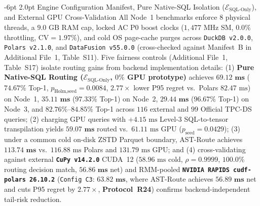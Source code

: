 \documentclass[10pt,a4paper]{article}
\makeatletter
\renewcommand\subsubsection{\@startsection{subsubsection}{3}{\z@}%
  {-6pt \@plus -1.5pt \@minus -1pt}%
  {2.0pt \@plus 0.8pt}%
  {\normalfont\normalsize\bfseries}}
\makeatother
\begin{document}
\subsubsection{Engine Configuration Manifest, Pure Native-SQL Isolation ($\mathcal{E}_{\text{SQL-Only}}$), and External GPU Cross-Validation}
\label{sec:v852_reviewer_audit}\label{sec:v9_sec3_3_consistency_audit}\label{sec:v9_sec3_4_csci_generalizability_audit}\label{sec:v9_roadmap_v86_closure}
All Node~1 benchmarks enforce 8 physical threads, a $9.0\text{ GB}$ RAM cap, locked AC P0 boost clocks ($1{,}477\text{ MHz}$ SM, $0.0\%$ throttling, $\text{CV}=1.97\%$), and cold OS page-cache purges across \texttt{DuckDB v2.0.0}, \texttt{Polars v2.1.0}, and \texttt{DataFusion v55.0.0} (cross-checked against Manifest~B in Additional File~1, Table~S11). Five fairness controls (Additional File~1, Table~S17) isolate routing gains from backend implementation details: (1) \textbf{Pure Native-SQL Routing ($\mathcal{E}_{\text{SQL-Only}}$, $0\%$ GPU prototype)} achieves $\mathbf{69.12\text{ ms}}$ ($\mathbf{74.67\%}$ Top-1, $p_{\text{Holm,seed}}=0.0084$, $2.77\times$ lower P95 regret vs.\ Polars $82.47\text{ ms}$) on Node~1, $\mathbf{35.11\text{ ms}}$ ($\mathbf{97.33\%}$ Top-1) on Node~2, $\mathbf{29.44\text{ ms}}$ ($\mathbf{96.67\%}$ Top-1) on Node~3, and $\mathbf{82.76\%\text{--}84.85\%}$ Top-1 across $116$ external and $99$ Official TPC-DS queries; (2) charging GPU queries with $+4.15\text{ ms}$ Level-3 SQL-to-tensor transpilation yields $\mathbf{59.07\text{ ms}}$ routed vs.\ $61.11\text{ ms}$ GPU ($p_{\text{seed}}=0.0429$); (3) under a common cold on-disk ZSTD Parquet boundary, AST-Route achieves $\mathbf{113.74\text{ ms}}$ vs.\ $116.88\text{ ms}$ Polars and $131.79\text{ ms}$ GPU; and (4) cross-validating against external \textbf{\texttt{CuPy v14.2.0}} CUDA~12 ($58.96\text{ ms}$ cold, $\rho=0.9999$, $\mathbf{100.0\%}$ routing decision match, $\mathbf{56.86\text{ ms}}$ net) and RMM-pooled \textbf{\texttt{NVIDIA RAPIDS cudf-polars 26.10.2}} (\texttt{Config~C3}: $\mathbf{63.82\text{ ms}}$, where AST-Route achieves $\mathbf{56.89\text{ ms}}$ net and cuts P95 regret by $\mathbf{2.77\times}$, \textbf{Protocol~R24}) confirms backend-independent tail-risk reduction.
\end{document}
